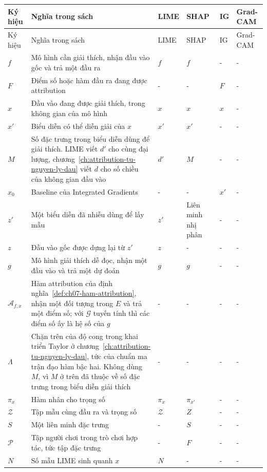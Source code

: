 \begin{longtable}{@{}lp{\kyhieuw}p{\kyhieuwmap}p{\kyhieuwmap}p{\kyhieuwmap}p{\kyhieuwlast}@{}}
\toprule
Ký hiệu & Nghĩa trong sách & LIME & SHAP & IG & Grad-CAM \\
\midrule
\endfirsthead
\toprule
Ký hiệu & Nghĩa trong sách & LIME & SHAP & IG & Grad-CAM \\
\midrule
\endhead
$f$ & Mô hình cần giải thích, nhận đầu vào gốc và trả một đầu ra & $f$ & $f$ & - & - \\
$F$ & Điểm số hoặc hàm đầu ra đang được attribution & - & - & $F$ & - \\
$x$ & Đầu vào đang được giải thích, trong không gian của mô hình & $x$ & $x$ & $x$ & - \\
$x'$ & Biểu diễn có thể diễn giải của $x$ & $x'$ & $x'$ & - & - \\
$M$ & Số đặc trưng trong biểu diễn dùng để giải thích. LIME viết $d'$ cho cùng đại lượng, chương~\ref{ch:attribution-tu-nguyen-ly-dau} viết $d$ cho số chiều của không gian đầu vào & $d'$ & $M$ & - & - \\
$x_0$ & Baseline của Integrated Gradients & - & - & $x'$ & - \\
$z'$ & Một biểu diễn đã nhiễu dùng để lấy mẫu & $z'$ & Liên minh nhị phân & - & - \\
$z$ & Đầu vào gốc được dựng lại từ $z'$ & $z$ & - & - & - \\
$g$ & Mô hình giải thích dễ đọc, nhận một đầu vào và trả một dự đoán & $g$ & $g$ & - & - \\
$\mathcal{A}_{f,x}$ & Hàm attribution của định nghĩa~\ref{def:ch07-ham-attribution}, nhận một đối tượng trong $E$ và trả một điểm số; với $\mathcal{G}$ tuyến tính thì các điểm số ấy là hệ số của $g$ & - & - & - & - \\
$\Lambda$ & Chặn trên của độ cong trong khai triển Taylor ở chương~\ref{ch:attribution-tu-nguyen-ly-dau}, tức của chuẩn ma trận đạo hàm bậc hai. Không dùng $M$, vì $M$ ở trên đã thuộc về số đặc trưng trong biểu diễn giải thích & - & - & - & - \\
$\pi_x$ & Hàm nhân cho trọng số & $\pi_x$ & $\pi_{x'}$ & - & - \\
$\mathcal{Z}$ & Tập mẫu cùng đầu ra và trọng số & $\mathcal{Z}$ & $Z$ & - & - \\
$S$ & Một liên minh đặc trưng & - & $S$ & - & - \\
$\mathcal{P}$ & Tập người chơi trong trò chơi hợp tác, tức tập đặc trưng & - & $F$ & - & - \\
$N$ & Số mẫu LIME sinh quanh $x$ & $N$ & - & - & - \\

\end{longtable}
